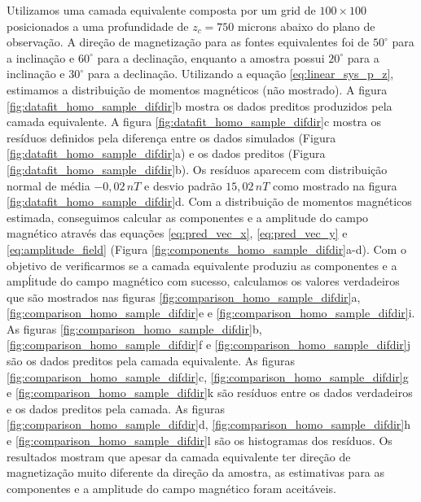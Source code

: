 Utilizamos uma camada equivalente composta por um grid de $100 \times 100$ posicionados a uma profundidade de $z_c = 750$ microns abaixo do plano de observação. A direção de magnetização para as fontes equivalentes foi de $50^\circ$ para a inclinação e $60^\circ$ para a declinação, enquanto a amostra possui $20^\circ$ para a inclinação e $30^\circ$ para a declinação. Utilizando a equação \ref{eq:linear_sys_p_z}, estimamos a distribuição de momentos magnéticos (não mostrado). A figura \ref{fig:datafit_homo_sample_difdir}b mostra os dados preditos produzidos pela camada equivalente. A figura \ref{fig:datafit_homo_sample_difdir}c mostra os resíduos definidos pela diferença entre os dados simulados (Figura \ref{fig:datafit_homo_sample_difdir}a) e os dados preditos (Figura \ref{fig:datafit_homo_sample_difdir}b). Os resíduos aparecem com distribuição normal de média $-0,02 \, nT$ e desvio padrão $15,02 \, nT$ como mostrado na figura \ref{fig:datafit_homo_sample_difdir}d. Com a distribuição de momentos magnéticos estimada, conseguimos calcular as componentes e a amplitude do campo magnético através das equações \ref{eq:pred_vec_x}, \ref{eq:pred_vec_y} e \ref{eq:amplitude_field} (Figura \ref{fig:components_homo_sample_difdir}a-d). Com o objetivo de verificarmos se a camada equivalente produziu as componentes e a ampĺitude do campo magnético com sucesso, calculamos os valores verdadeiros que são mostrados nas  figuras \ref{fig:comparison_homo_sample_difdir}a, \ref{fig:comparison_homo_sample_difdir}e e \ref{fig:comparison_homo_sample_difdir}i. As figuras \ref{fig:comparison_homo_sample_difdir}b, \ref{fig:comparison_homo_sample_difdir}f e \ref{fig:comparison_homo_sample_difdir}j são os dados preditos pela camada equivalente. As figuras \ref{fig:comparison_homo_sample_difdir}c, \ref{fig:comparison_homo_sample_difdir}g e \ref{fig:comparison_homo_sample_difdir}k são resíduos entre os dados verdadeiros e os dados preditos pela camada. As figuras \ref{fig:comparison_homo_sample_difdir}d, \ref{fig:comparison_homo_sample_difdir}h e \ref{fig:comparison_homo_sample_difdir}l são os histogramas dos resíduos. Os resultados mostram que apesar da camada equivalente ter direção de magnetização muito diferente da direção da amostra, as estimativas para as componentes e a amplitude do campo magnético foram aceitáveis.  



